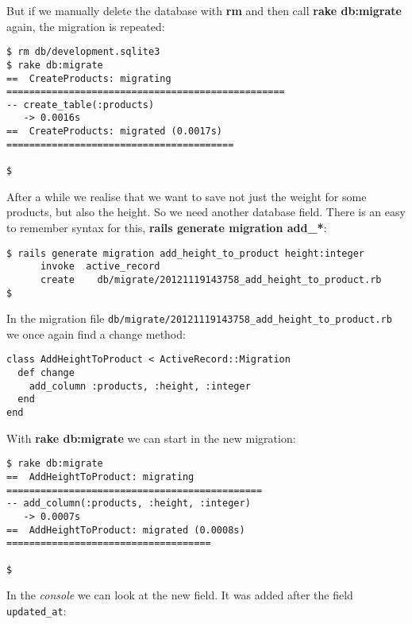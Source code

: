 \documentclass[a4paper]{book}
\newcounter{tab}[chapter]
\begin{document}
But if we manually delete the database with \textbf{rm} and then call \textbf{rake db:migrate} again, the migration is repeated:

\begin{shaded}\begin{verbatim}
$ rm db/development.sqlite3
$ rake db:migrate
==  CreateProducts: migrating =================================================
-- create_table(:products)
   -> 0.0016s
==  CreateProducts: migrated (0.0017s) ========================================

$  
\end{verbatim}\end{shaded}

After a while we realise that we want to save not just the weight for some products, but also the height. So we need another database field. There is an easy to remember syntax for this, \textbf{rails generate migration add\_*}:

\begin{shaded}\begin{verbatim}
$ rails generate migration add_height_to_product height:integer
      invoke  active_record
      create    db/migrate/20121119143758_add_height_to_product.rb
$
\end{verbatim}\end{shaded}

In the migration file \texttt{db/migrate/20121119143758\_add\_height\_to\_product.rb} we once again find a change method:

\begin{shaded}\begin{verbatim}
class AddHeightToProduct < ActiveRecord::Migration
  def change
    add_column :products, :height, :integer
  end
end
\end{verbatim}\end{shaded}

With \textbf{rake db:migrate} we can start in the new migration:

\begin{shaded}\begin{verbatim}
$ rake db:migrate
==  AddHeightToProduct: migrating =============================================
-- add_column(:products, :height, :integer)
   -> 0.0007s
==  AddHeightToProduct: migrated (0.0008s) ====================================

$
\end{verbatim}\end{shaded}

In the \emph{console} we can look at the new field. It was added after the field \texttt{updated\_at}:
\end{document}

